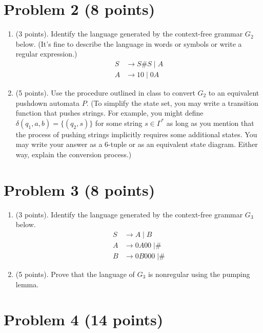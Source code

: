 \documentclass[letterpaper,11pt,twoside]{article}
\theoremstyle{plain}
\theoremstyle{definition}
\theoremstyle{remark}
\theoremstyle{restate}
\begin{document}
\clearpage
\section{Problem 2 (8 points)}
\begin{enumerate}
    \item (3 points). Identify the language generated by the context-free grammar $G_2$ below. (It's fine to describe the language in words or symbols or write a regular expression.)
    \begin{align*}
        S &\rightarrow S\#S \; |\; A \\
        A &\rightarrow 10 \;|\; 0A
    \end{align*}
    
    \item (5 points). Use the procedure outlined in class to convert $G_2$ to an equivalent pushdown automata $P$. (To simplify the state set, you may write a transition function that pushes strings. For example, you might define $\delta(q_1, a, b) = \{(q_2, s)\}$ for some string $s \in \Gamma^*$ as long as you mention that the process of pushing strings implicitly requires some additional states. You may write your answer as a 6-tuple or as an equivalent state diagram. Either way, explain the conversion process.)
\end{enumerate}

\clearpage
\section{Problem 3 (8 points)}


\begin{enumerate}
    \item (3 points). Identify the language generated by the context-free grammar $G_3$ below.
    \begin{align*}
        S &\rightarrow A \; | \; B \\
        A &\rightarrow 0A00 \; | \# \\
        B &\rightarrow 0B000 \; | \#
    \end{align*}
    
    \item (5 points). Prove that the language of $G_3$ is nonregular using the pumping lemma.
\end{enumerate}

\clearpage
\section{Problem 4 (14 points)}
\end{document}
